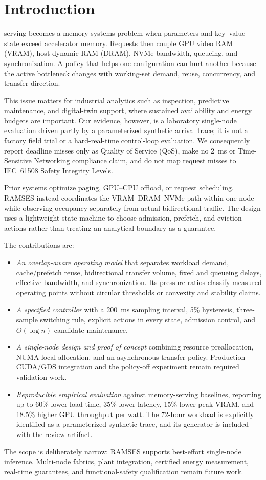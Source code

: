 \section{Introduction}\label{sec:introduction}
 serving becomes a memory-systems problem when parameters and key--value state exceed accelerator memory. Requests then couple GPU video RAM (VRAM), host dynamic RAM (DRAM), NVMe bandwidth, queueing, and synchronization. A policy that helps one configuration can hurt another because the active bottleneck changes with working-set demand, reuse, concurrency, and transfer direction.

This issue matters for industrial analytics such as inspection, predictive maintenance, and digital-twin support, where sustained availability and energy budgets are important. Our evidence, however, is a laboratory single-node evaluation driven partly by a parameterized synthetic arrival trace; it is not a factory field trial or a hard-real-time control-loop evaluation. We consequently report deadline misses only as Quality of Service (QoS), make no 2~ms or Time-Sensitive Networking compliance claim, and do not map request misses to IEC~61508 Safety Integrity Levels.

Prior systems optimize paging, GPU--CPU offload, or request scheduling. RAMSES instead coordinates the VRAM--DRAM--NVMe path within one node while observing occupancy separately from actual bidirectional traffic. The design uses a lightweight state machine to choose admission, prefetch, and eviction actions rather than treating an analytical boundary as a guarantee.

The contributions are:
\begin{itemize}
\item \emph{An overlap-aware operating model} that separates workload demand, cache/prefetch reuse, bidirectional transfer volume, fixed and queueing delays, effective bandwidth, and synchronization. Its pressure ratios classify measured operating points without circular thresholds or convexity and stability claims.
\item \emph{A specified controller} with a 200~ms sampling interval, 5\% hysteresis, three-sample switching rule, explicit actions in every state, admission control, and $O(\log n)$ candidate maintenance.
\item \emph{A single-node design and proof of concept} combining resource preallocation, NUMA-local allocation, and an asynchronous-transfer policy. Production CUDA/GDS integration and the policy-off experiment remain required validation work.
\item \emph{Reproducible empirical evaluation} against memory-serving baselines, reporting up to 60\% lower load time, 35\% lower latency, 15\% lower peak VRAM, and 18.5\% higher GPU throughput per watt. The 72-hour workload is explicitly identified as a parameterized synthetic trace, and its generator is included with the review artifact.
\end{itemize}

The scope is deliberately narrow: RAMSES supports best-effort single-node inference. Multi-node fabrics, plant integration, certified energy measurement, real-time guarantees, and functional-safety qualification remain future work.
